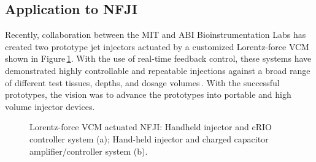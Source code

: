     
    \subsection{Application to \acs{NFJI}}          \label{Chapter:background/voice coil motors for NFJI/application}
    
    
    Recently, collaboration between the \ac{MIT} and \ac{ABI} Bioinstrumentation Labs has created two prototype jet injectors actuated by a customized Lorentz-force \ac{VCM}\,\cite{taberner2006,ruddy2014} shown in Figure\,\ref{fig:chapter/background/vcm injectors}. With the use of real-time feedback control, these systems have demonstrated highly controllable and repeatable injections against a broad range of different test tissues, depths, and dosage volumes\,\cite{taberner2012}. With the successful prototypes, the vision was to advance the prototypes into portable and high volume injector devices.


    \begin{figure}[!ht]
        \centering
        \qquad
        \caption{
            Lorentz-force \acs{VCM} actuated \ac{NFJI}: Handheld injector and cRIO controller system (a); Hand-held injector and charged capacitor amplifier/controller system (b).
        }   \label{fig:chapter/background/vcm injectors}
    \end{figure}
    
